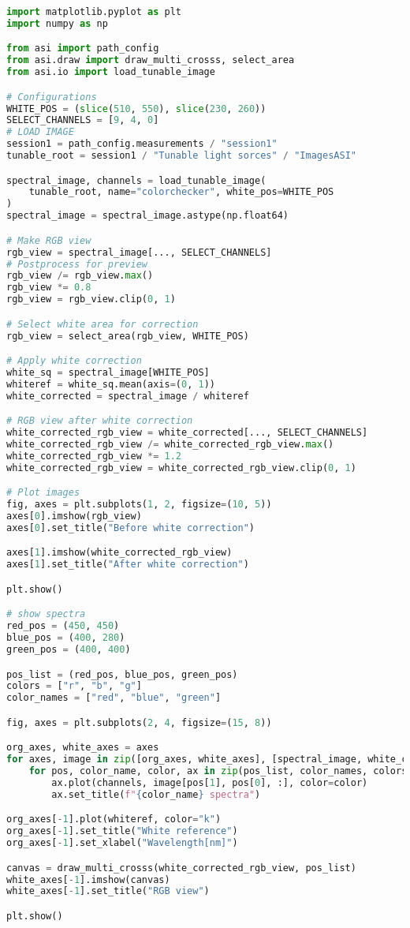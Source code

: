 \begin{lstlisting}[language=python, caption=White correction for Tunable Light Sources with small white reference, label={code:wc-tunable}]
import matplotlib.pyplot as plt
import numpy as np

from asi import path_config
from asi.draw import draw_multi_crosss, select_area
from asi.io import load_tunable_image

# Configurations
WHITE_POS = (slice(510, 550), slice(230, 260))
SELECT_CHANNELS = [9, 4, 0]
# LOAD IMAGE
session1 = path_config.measurements / "session1"
tunable_root = session1 / "Tunable light sorces" / "ImagesASI"

spectral_image, channels = load_tunable_image(
    tunable_root, name="colorchecker", white_pos=WHITE_POS
)
spectral_image = spectral_image.astype(np.float64)

# Make RGB view
rgb_view = spectral_image[..., SELECT_CHANNELS]
# Postprocess for preview
rgb_view /= rgb_view.max()
rgb_view *= 0.8
rgb_view = rgb_view.clip(0, 1)

# Select white area for correction
rgb_view = select_area(rgb_view, WHITE_POS)

# Apply white correction
white_sq = spectral_image[WHITE_POS]
whiteref = white_sq.mean(axis=(0, 1))
white_corrected = spectral_image / whiteref

# RGB view after white correction
white_corrected_rgb_view = white_corrected[..., SELECT_CHANNELS]
white_corrected_rgb_view /= white_corrected_rgb_view.max()
white_corrected_rgb_view *= 1.2
white_corrected_rgb_view = white_corrected_rgb_view.clip(0, 1)

# Plot images
fig, axes = plt.subplots(1, 2, figsize=(10, 5))
axes[0].imshow(rgb_view)
axes[0].set_title("Before white correction")

axes[1].imshow(white_corrected_rgb_view)
axes[1].set_title("After white correction")

plt.show()

# show spectra
red_pos = (450, 450)
blue_pos = (400, 280)
green_pos = (400, 400)

pos_list = (red_pos, blue_pos, green_pos)
colors = ["r", "b", "g"]
color_names = ["red", "blue", "green"]

fig, axes = plt.subplots(2, 4, figsize=(15, 8))

org_axes, white_axes = axes
for axes, image in zip([org_axes, white_axes], [spectral_image, white_corrected]):
    for pos, color_name, color, ax in zip(pos_list, color_names, colors, axes):
        ax.plot(channels, image[pos[1], pos[0], :], color=color)
        ax.set_title(f"{color_name} spectra")

org_axes[-1].plot(whiteref, color="k")
org_axes[-1].set_title("White reference")
org_axes[-1].set_xlabel("Wavelength[nm]")

canvas = draw_multi_crosss(white_corrected_rgb_view, pos_list)
white_axes[-1].imshow(canvas)
white_axes[-1].set_title("RGB view")

plt.show()
\end{lstlisting}
